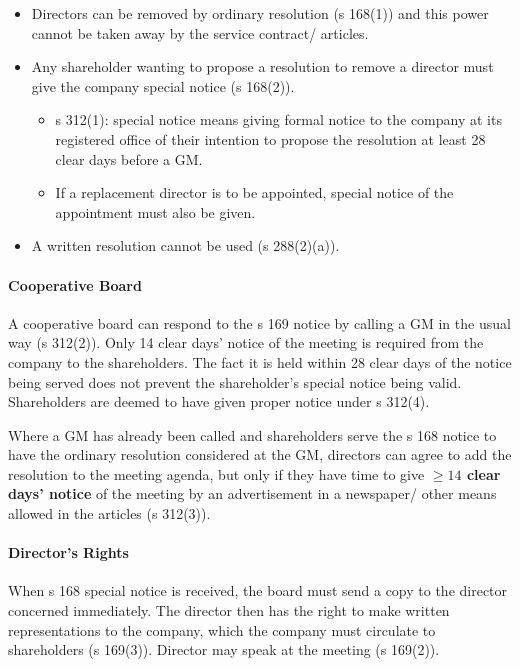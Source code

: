 \documentclass[
]{article}
\providecommand{\tightlist}{%
  \setlength{\itemsep}{0pt}\setlength{\parskip}{0pt}}
\begin{document}
\begin{itemize}
\tightlist
\item
  Directors can be removed by ordinary resolution (s 168(1)) and this
  power cannot be taken away by the service contract/ articles.
\item
  Any shareholder wanting to propose a resolution to remove a director
  must give the company special notice (s 168(2)).

  \begin{itemize}
  \tightlist
  \item
    s 312(1): special notice means giving formal notice to the company
    at its registered office of their intention to propose the
    resolution at least 28 clear days before a GM.
  \item
    If a replacement director is to be appointed, special notice of the
    appointment must also be given.
  \end{itemize}
\item
  A written resolution cannot be used (s 288(2)(a)).
\end{itemize}

\hypertarget{cooperative-board}{%
\paragraph{Cooperative Board}\label{cooperative-board}}

A cooperative board can respond to the s 169 notice by calling a GM in
the usual way (s 312(2)). Only 14 clear days' notice of the meeting is
required from the company to the shareholders. The fact it is held
within 28 clear days of the notice being served does not prevent the
shareholder's special notice being valid. Shareholders are deemed to
have given proper notice under s 312(4).

Where a GM has already been called and shareholders serve the s 168
notice to have the ordinary resolution considered at the GM, directors
can agree to add the resolution to the meeting agenda, but only if they
have time to give \textbf{\(\geq 14\) clear days' notice} of the meeting
by an advertisement in a newspaper/ other means allowed in the articles
(s 312(3)).

\hypertarget{directors-rights}{%
\paragraph{Director's Rights}\label{directors-rights}}

When s 168 special notice is received, the board must send a copy to the
director concerned immediately. The director then has the right to make
written representations to the company, which the company must circulate
to shareholders (s 169(3)). Director may speak at the meeting (s
169(2)).
\end{document}
